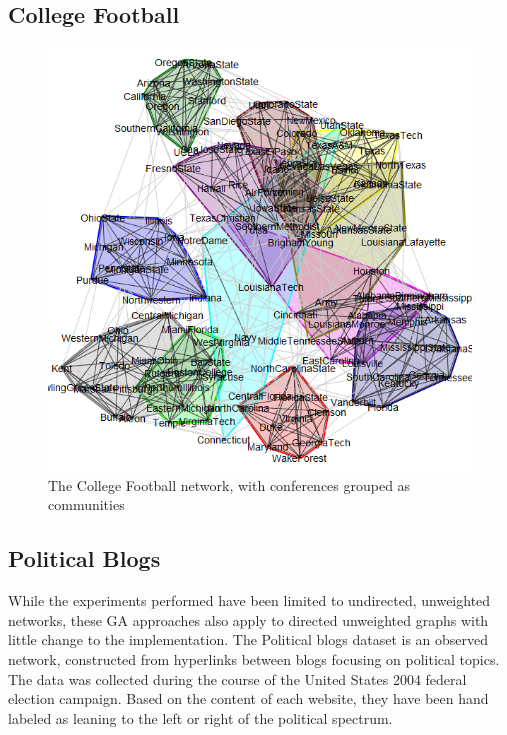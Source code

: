 \subsection{College Football}

\cite{Girvan2002}
\begin{figure}[!htb]
	\begin{center}
		\includegraphics[scale=.4]{images/football.png}
	\end{center}
	\caption{The College Football network, with conferences grouped as communities}
	\label{logo}
\end{figure}


\subsection{Political Blogs}
While the experiments performed have been limited to undirected, unweighted networks, these GA approaches also apply to directed unweighted graphs with little change to the implementation. The Political blogs dataset\cite{Adamic2005} is an observed network, constructed from hyperlinks between blogs focusing on political topics. The data was collected during the course of the United States 2004 federal election campaign. Based on the content of each website, they have been hand labeled as leaning to the left or right of the political spectrum.

